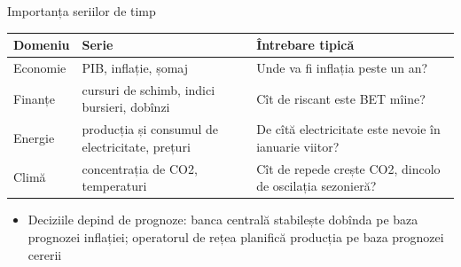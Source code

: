 \begin{frame}{Importanța seriilor de timp}
\itemsize{\footnotesize}
\begin{center}
\footnotesize
\begin{tabular}{>{\raggedright\arraybackslash}p{1.9cm}>{\raggedright\arraybackslash}p{4.3cm}>{\raggedright\arraybackslash}p{6.2cm}}
\toprule
\textbf{Domeniu} & \textbf{Serie} & \textbf{Întrebare tipică} \\
\midrule
Economie & PIB, inflație, șomaj & Unde va fi inflația peste un an? \\
Finanțe & cursuri de schimb, indici bursieri, dobînzi & Cît de riscant este BET mîine? \\
Energie & producția și consumul de electricitate, prețuri & De cîtă electricitate este nevoie în ianuarie viitor? \\
Climă & concentrația de CO2, temperaturi & Cît de repede crește CO2, dincolo de oscilația sezonieră? \\
\bottomrule
\end{tabular}
\end{center}
\begin{itemize}
    \item Deciziile depind de prognoze: banca centrală stabilește dobînda pe baza prognozei inflației; operatorul de rețea planifică producția pe baza prognozei cererii
\end{itemize}
\end{frame}

